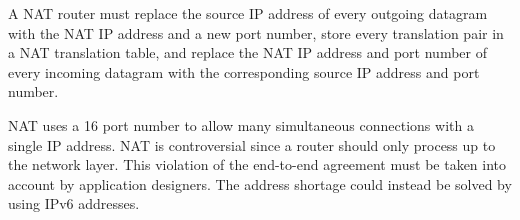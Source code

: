A NAT router must replace the source IP address of every outgoing datagram with the NAT IP address and a new port number, store every translation pair in a NAT translation table, and replace the NAT IP address and port number of every incoming datagram with the corresponding source IP address and port number.

NAT uses a \SI{16}{\bit} port number to allow many simultaneous connections with a single IP address.
NAT is controversial since a router should only process up to the network layer.
This violation of the end-to-end agreement must be taken into account by application designers.
The address shortage could instead be solved by using IPv6 addresses.
